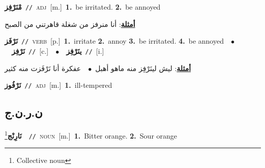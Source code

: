 \documentclass[10pt,a4paper,twoside]{article} %
\begin{document}
\begin{multicols}{2}
{\setlength\topsep{0pt}\textbf{\foreignlanguage{arabic}{مْنَرْفِز}}\ {\color{gray}\texttt{//}\color{black}}\ \textsc{adj}\ [m.]\ \textbf{1.}~be irritated.  \textbf{2.}~be annoyed\  \begin{flushright}\color{gray}\foreignlanguage{arabic}{\textbf{\underline{\foreignlanguage{arabic}{أمثلة}}}: أنا منرفز من شغلة قاهرتني من الصبح}\end{flushright}\color{black}} \vspace{2mm}

{\setlength\topsep{0pt}\textbf{\foreignlanguage{arabic}{نَرْفَز}}\ {\color{gray}\texttt{//}\color{black}}\ \textsc{verb}\ [p.]\ \textbf{1.}~irritate  \textbf{2.}~annoy  \textbf{3.}~be irritated.  \textbf{4.}~be annoyed\ \ $\bullet$\ \ \setlength\topsep{0pt}\textbf{\foreignlanguage{arabic}{نَرْفِز}}\ {\color{gray}\texttt{//}\color{black}}\ [c.]\ \ $\bullet$\ \ \setlength\topsep{0pt}\textbf{\foreignlanguage{arabic}{ينَرْفِز}}\ {\color{gray}\texttt{//}\color{black}}\ [i.]\  \begin{flushright}\color{gray}\foreignlanguage{arabic}{\textbf{\underline{\foreignlanguage{arabic}{أمثلة}}}: ليش لينَرْفِز منه ماهو أهبل\ $\bullet$\ \  عفكرة أنا نَرْفَزت منه كثير}\end{flushright}\color{black}} \vspace{2mm}

{\setlength\topsep{0pt}\textbf{\foreignlanguage{arabic}{نَرْفُوز}}\ {\color{gray}\texttt{//}\color{black}}\ \textsc{adj}\ [m.]\ \textbf{1.}~ill-tempered\ } \vspace{2mm}

\vspace{-3mm}
\subsection*{\color{blue}\foreignlanguage{arabic}{ن.ر.ن.ج}\color{blue}{ (ntws)}} 

{\setlength\topsep{0pt}\textbf{\foreignlanguage{arabic}{نَارِنْج}}\footnote{Collective noun}\ \ {\color{gray}\texttt{//}\color{black}}\ \textsc{noun}\ [m.]\ \textbf{1.}~Bitter orange.  \textbf{2.}~Sour orange\ } \vspace{2mm}


\end{multicols}
\end{document}
